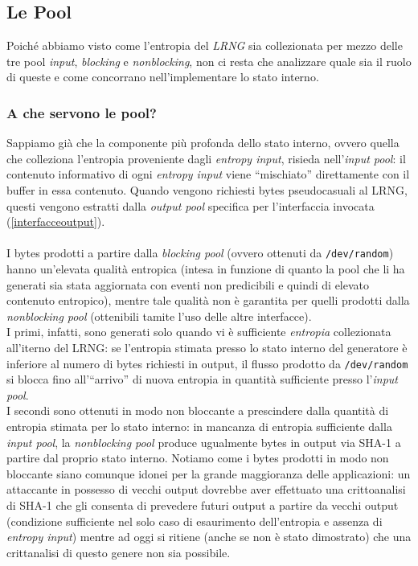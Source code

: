 \documentclass{article}
\begin{document}
 

\subsection{Le Pool}\label{pool}
 Poiché abbiamo visto come l'entropia del \emph{LRNG} sia collezionata per mezzo
 delle tre pool \emph{input}, \emph{blocking} e \emph{nonblocking}, non ci resta
 che analizzare quale sia il ruolo di queste e come concorrano
 nell'implementare lo stato interno.
 \subsubsection{A che servono le pool?}\label{poolACosaServono}
 Sappiamo già che la componente più profonda dello stato interno, ovvero quella
 che colleziona l'entropia proveniente dagli \emph{entropy input}, risieda
 nell'\emph{input pool}: il contenuto informativo di ogni \emph{entropy input}
 viene ``mischiato'' direttamente con il buffer in essa contenuto.
 Quando vengono richiesti bytes pseudocasuali al LRNG, questi vengono
 estratti dalla \emph{output pool} specifica per l'interfaccia invocata
 (\ref{interfacceoutput}).
 \paragraph{}I bytes prodotti a partire dalla
 \emph{blocking pool} (ovvero ottenuti da \verb+/dev/random+) hanno un'elevata
 qualità entropica (intesa in funzione di quanto la pool che li ha generati sia
 stata aggiornata con eventi non predicibili e quindi di elevato contenuto
 entropico), mentre tale qualità non è garantita per quelli prodotti dalla
 \emph{nonblocking pool} (ottenibili tamite l'uso delle altre interfacce).\\
 I primi, infatti, sono generati solo quando vi è sufficiente \emph{entropia}
 collezionata all'iterno del LRNG: se l'entropia stimata presso lo stato interno
 del generatore è inferiore al numero di bytes richiesti in output,
 il flusso prodotto da \verb+/dev/random+ si blocca fino all'``arrivo'' di nuova
 entropia in quantità sufficiente presso l'\emph{input pool}.\\ I secondi sono
 ottenuti in modo non bloccante a prescindere dalla quantità di entropia
 stimata per lo stato interno: in mancanza di entropia sufficiente dalla
 \emph{input pool}, la \emph{nonblocking pool} produce ugualmente bytes in
 output via SHA-1 a partire dal proprio stato interno. Notiamo come i bytes
 prodotti in modo non bloccante siano comunque idonei per la grande maggioranza
 delle applicazioni: un attaccante in possesso di vecchi output dovrebbe
 aver effettuato una crittoanalisi di SHA-1 che gli consenta di prevedere futuri
 output a partire da vecchi output (condizione sufficiente nel solo caso di
 esaurimento dell'entropia e assenza di \emph{entropy input}) mentre ad oggi si
 ritiene (anche se non è stato dimostrato) che una crittanalisi di questo genere
 non sia possibile.
 
\end{document}
